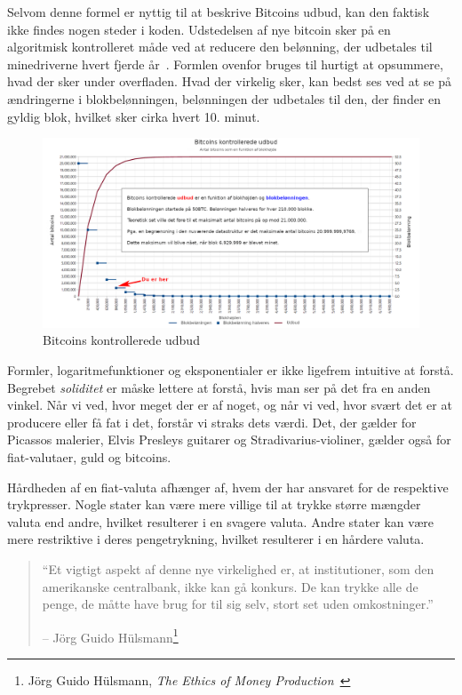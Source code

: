 \documentclass[paper=6in:9in,pagesize=pdftex,
               headinclude=on,footinclude=on,12pt]{scrbook}
\begin{document}
Selvom denne formel er nyttig til at beskrive Bitcoins udbud, kan den faktisk ikke findes nogen steder i koden. Udstedelsen af nye bitcoin sker på en algoritmisk kontrolleret måde ved at reducere den belønning, der udbetales til minedriverne hvert fjerde år~\cite{btcwiki:supply}. Formlen ovenfor bruges til hurtigt at opsummere, hvad der sker under overfladen. Hvad der virkelig sker, kan bedst ses ved at se på ændringerne i blokbelønningen, belønningen der udbetales til den, der finder en gyldig blok, hvilket sker cirka hvert 10. minut.\begin{figure}
  \includegraphics{assets/images/you-are-here.png}
  \caption{Bitcoins kontrollerede udbud}
  \label{fig:you-are-here.png}
\end{figure}

Formler, logaritmefunktioner og eksponentialer er ikke ligefrem intuitive at forstå. Begrebet \textit{soliditet} er måske lettere at forstå, hvis man ser på det fra en anden vinkel. Når vi ved, hvor meget der er af noget, og når vi ved, hvor svært det er at producere eller få fat i det, forstår vi straks dets værdi. Det, der gælder for Picassos malerier, Elvis Presleys guitarer og Stradivarius-violiner, gælder også for fiat-valutaer, guld og bitcoins.

Hårdheden af en fiat-valuta afhænger af, hvem der har ansvaret for de respektive trykpresser. Nogle stater kan være mere villige til at trykke større mængder valuta end andre, hvilket resulterer i en svagere valuta. Andre stater kan være mere restriktive i deres pengetrykning, hvilket resulterer i en hårdere valuta.\begin{samepage}\begin{quotation} \enquote{Et vigtigt aspekt af denne nye virkelighed er, at institutioner, som den amerikanske centralbank, ikke kan gå konkurs. De kan trykke alle de penge, de måtte have brug for til sig selv, stort set uden omkostninger.} \begin{flushright} -- Jörg Guido Hülsmann\footnote{Jörg Guido Hülsmann, \textit{The Ethics of Money Production}~\cite{hulsmann2008ethics}}
\end{flushright}\end{quotation}\end{samepage}
\end{document}
